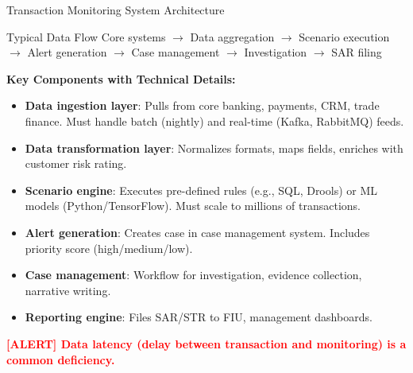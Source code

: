 \documentclass[11pt,a4paper]{beamer}
\newcommand{\redflag}[1]{\textcolor{red}{\textbf{[ALERT] #1}}}
\begin{document}
\begin{frame}{Transaction Monitoring System Architecture}
	\begin{block}{Typical Data Flow}
		Core systems $\rightarrow$ Data aggregation $\rightarrow$ Scenario execution $\rightarrow$ Alert generation $\rightarrow$ Case management $\rightarrow$ Investigation $\rightarrow$ SAR filing
	\end{block}
	\textbf{Key Components with Technical Details:}
	\begin{itemize}
		\item \textbf{Data ingestion layer}: Pulls from core banking, payments, CRM, trade finance. Must handle batch (nightly) and real-time (Kafka, RabbitMQ) feeds.
		\item \textbf{Data transformation layer}: Normalizes formats, maps fields, enriches with customer risk rating.
		\item \textbf{Scenario engine}: Executes pre-defined rules (e.g., SQL, Drools) or ML models (Python/TensorFlow). Must scale to millions of transactions.
		\item \textbf{Alert generation}: Creates case in case management system. Includes priority score (high/medium/low).
		\item \textbf{Case management}: Workflow for investigation, evidence collection, narrative writing.
		\item \textbf{Reporting engine}: Files SAR/STR to FIU, management dashboards.
	\end{itemize}
	\redflag{Data latency (delay between transaction and monitoring) is a common deficiency.}
\end{frame}
\end{document}
